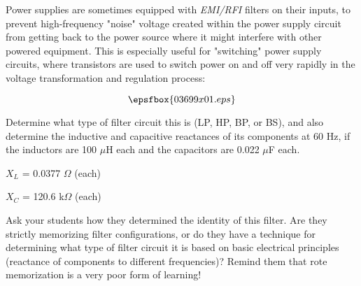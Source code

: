 

Power supplies are sometimes equipped with {\it EMI/RFI} filters on their inputs, to prevent high-frequency "noise" voltage created within the power supply circuit from getting back to the power source where it might interfere with other powered equipment.  This is especially useful for "switching" power supply circuits, where transistors are used to switch power on and off very rapidly in the voltage transformation and regulation process:

$$\epsfbox{03699x01.eps}$$

Determine what type of filter circuit this is (LP, HP, BP, or BS), and also determine the inductive and capacitive reactances of its components at 60 Hz, if the inductors are 100 $\mu$H each and the capacitors are 0.022 $\mu$F each.







$X_L$ = 0.0377 $\Omega$ (each)

\vskip 10pt

$X_C$ = 120.6 k$\Omega$ (each)







Ask your students how they determined the identity of this filter.  Are they strictly memorizing filter configurations, or do they have a technique for determining what type of filter circuit it is based on basic electrical principles (reactance of components to different frequencies)?  Remind them that rote memorization is a very poor form of learning!





